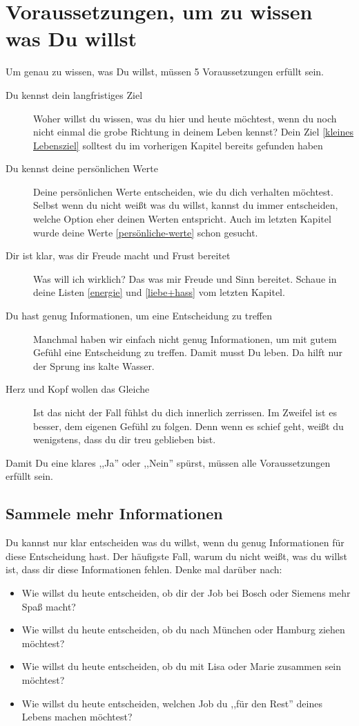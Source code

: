 \documentclass[../Lebensziel.tex]{subfiles}
\begin{document}
\section{Voraussetzungen, um zu wissen was Du willst}
Um genau zu wissen, was Du willst, müssen 5 Voraussetzungen erfüllt sein.
\begin{description}
    \item[Du kennst dein langfristiges Ziel] Woher willst du wissen, was du hier und heute möchtest, wenn du noch nicht einmal die grobe Richtung in deinem Leben kennst? Dein Ziel \ref{kleines Lebensziel} solltest du im vorherigen Kapitel bereits gefunden haben
    \item[Du kennst deine persönlichen Werte] Deine persönlichen Werte entscheiden, wie du dich verhalten möchtest. Selbst wenn du nicht weißt was du willst, kannst du immer entscheiden, welche Option eher deinen Werten entspricht. Auch im letzten Kapitel wurde deine Werte \ref{persönliche-werte} schon gesucht.
    \item[Dir ist klar, was dir Freude macht und Frust bereitet] Was will ich wirklich? Das was mir Freude und Sinn bereitet. Schaue in deine Listen \ref{energie} und \ref{liebe+hass} vom letzten Kapitel.
    \item[Du hast genug Informationen, um eine Entscheidung zu treffen] Manchmal haben wir einfach nicht genug Informationen, um mit gutem Gefühl eine Entscheidung zu treffen. Damit musst Du leben. Da hilft nur der Sprung ins kalte Wasser.
    \item[Herz und Kopf wollen das Gleiche] Ist das nicht der Fall fühlst du dich innerlich zerrissen. Im Zweifel ist es besser, dem eigenen Gefühl zu folgen. Denn wenn es schief geht, weißt du wenigstens, dass du dir treu geblieben bist.
\end{description}

Damit Du eine klares ,,Ja'' oder ,,Nein'' spürst, müssen alle Voraussetzungen erfüllt sein.

\subsection{Sammele mehr Informationen}
Du kannst nur klar entscheiden was du willst, wenn du genug Informationen für diese Entscheidung hast. Der häufigste Fall, warum du nicht weißt, was du willst ist, dass dir diese Informationen fehlen.
Denke mal darüber nach:
\begin{itemize}
    \item Wie willst du heute entscheiden, ob dir der Job bei Bosch oder Siemens mehr Spaß macht?
\item Wie willst du heute entscheiden, ob du nach München oder Hamburg ziehen möchtest?
\item Wie willst du heute entscheiden, ob du mit Lisa oder Marie zusammen sein möchtest?
\item Wie willst du heute entscheiden, welchen Job du ,,für den Rest'' deines Lebens machen möchtest?
\end{itemize}
\end{document}
